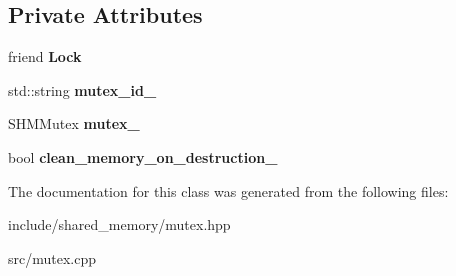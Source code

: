 \subsection*{Private Attributes}
\begin{DoxyCompactItemize}
\item 
friend {\bfseries Lock}\hypertarget{classshared__memory_1_1Mutex_ac8f2675b262549f321f417323cf0702a}{}\label{classshared__memory_1_1Mutex_ac8f2675b262549f321f417323cf0702a}

\item 
std\+::string {\bfseries mutex\+\_\+id\+\_\+}\hypertarget{classshared__memory_1_1Mutex_a2ab98408f60b14b160fae683b1a88977}{}\label{classshared__memory_1_1Mutex_a2ab98408f60b14b160fae683b1a88977}

\item 
S\+H\+M\+Mutex {\bfseries mutex\+\_\+}\hypertarget{classshared__memory_1_1Mutex_afc39f23ad6cfe9db45dd2de177a1ede1}{}\label{classshared__memory_1_1Mutex_afc39f23ad6cfe9db45dd2de177a1ede1}

\item 
bool {\bfseries clean\+\_\+memory\+\_\+on\+\_\+destruction\+\_\+}\hypertarget{classshared__memory_1_1Mutex_a065ff25889e198e37021504fbe5feac8}{}\label{classshared__memory_1_1Mutex_a065ff25889e198e37021504fbe5feac8}

\end{DoxyCompactItemize}


The documentation for this class was generated from the following files\+:\begin{DoxyCompactItemize}
\item 
include/shared\+\_\+memory/mutex.\+hpp\item 
src/mutex.\+cpp\end{DoxyCompactItemize}
